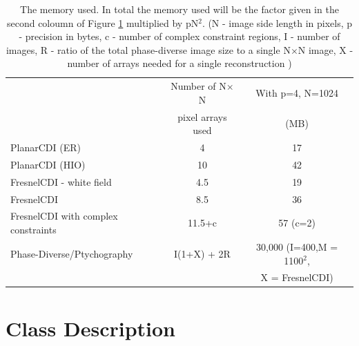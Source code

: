 \documentclass[]{cxs-software}
\begin{document}
\begin{table}[h!]
\begin{tabular}[h!]{lcc}
\toprule
&  Number of N$\times$N & With p=4, N=1024 \\
&  pixel arrays used & (MB) \\
\midrule
PlanarCDI (ER) & 4 & 17 \\
PlanarCDI (HIO) & 10 & 42  \\
FresnelCDI - white field & 4.5 & 19 \\
FresnelCDI & 8.5 & 36 \\
FresnelCDI with complex constraints & 11.5+c & 57 (c=2) \\
Phase-Diverse/Ptychography & I(1+X) + 2R & 30,000 (I=400,M = 1100$^2$, \\
 &                 & X = FresnelCDI)  \\
\bottomrule
\end{tabular}

\caption{\label{table:memory}The memory used. 
In total the memory used will be the factor given in the second
coloumn of Figure \ref{table:memory} multiplied by pN$^2$.
(N - image side length in pixels, p - precision in bytes, 
c - number of complex constraint regions, I - number of images, 
R - ratio of the total phase-diverse image size to a single N$\times$N image,
X - number of arrays needed for a single reconstruction ) 
}
\end{table}



\appendix



\section{Class Description} 
\end{document}
